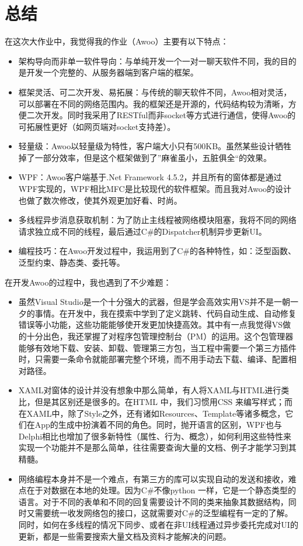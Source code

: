 \documentclass[a4paper,11pt]{article}
\begin{document}
\section{总结}
    在这次大作业中，我觉得我的作业（Awoo）主要有以下特点：\par
    \begin{itemize}
        \item 架构导向而非单一软件导向：与单纯开发一个一对一聊天软件不同，我的目的是开发一个完整的、从服务器端到客户端的框架。
        \item 框架灵活、可二次开发、易拓展：与传统的聊天软件不同，Awoo相对灵活，可以部署在不同的网络范围内。我的框架还是开源的，代码结构较为清晰，方便二次开发。同时我采用了RESTful而非socket等方式进行通信，使得Awoo的可拓展性更好（如网页端对socket支持差）。
        \item 轻量级：Awoo以轻量级为特性，客户端大小只有500KB。虽然某些设计牺牲掉了一部分效率，但是这个框架做到了”麻雀虽小，五脏俱全“的效果。
        \item WPF：Awoo客户端基于.Net Framework 4.5.2，并且所有的窗体都是通过WPF实现的，WPF相比MFC是比较现代的软件框架。而且我对Awoo的设计也做了数次修改，使其外观更加好看、时尚。
        \item 多线程异步消息获取机制：为了防止主线程被网络模块阻塞，我将不同的网络请求独立成不同的线程，最后通过C\#的Dispatcher机制异步更新UI。
        \item 编程技巧：在Awoo开发过程中，我运用到了C\#的各种特性，如：泛型函数、泛型约束、静态类、委托等。
    \end{itemize}
    在开发Awoo的过程中，我也遇到了不少难题：\par
    \begin{itemize}
        \item 虽然Visual Studio是一个十分强大的武器，但是学会高效实用VS并不是一朝一夕的事情。在开发中，我在摸索中学到了定义跳转、代码自动生成、自动修复错误等小功能，这些功能能够使开发更加快捷高效。其中有一点我觉得VS做的十分出色，我还掌握了对程序包管理控制台（PM）的运用。这个包管理器能够有效地下载、安装、卸载、管理第三方包，当工程中需要一个第三方插件时，只需要一条命令就能部署完整个环境，而不用手动去下载、编译、配置相对路径。
        \item XAML对窗体的设计并没有想象中那么简单，有人将XAML与HTML进行类比，但是其区别还是很多的。在HTML 中，我们习惯用CSS 来编写样式；而在XAML中，除了Style之外，还有诸如Resources、Template等诸多概念，它们在App的生成中扮演着不同的角色。同时，抛开语言的区别，WPF也与Delphi相比也增加了很多新特性（属性、行为、概念），如何利用这些特性来实现一个功能并不是那么简单，往往需要查询大量的文档、例子才能学习到其精髓。
        \item 网络编程本身并不是一个难点，有第三方的库可以实现自动的发送和接收，难点在于对数据在本地的处理。因为C\#不像python 一样，它是一个静态类型的语言。对于不同的表单和不同的回复需要设计不同的类来抽象其数据结构，同时又需要统一收发网络包的接口，这就需要对C\#的泛型编程有一定的了解。同时，如何在多线程的情况下同步、或者在非UI线程通过异步委托完成对UI的更新，都是一些需要搜索大量文档及资料才能解决的问题。
    \end{itemize}
\end{document}
